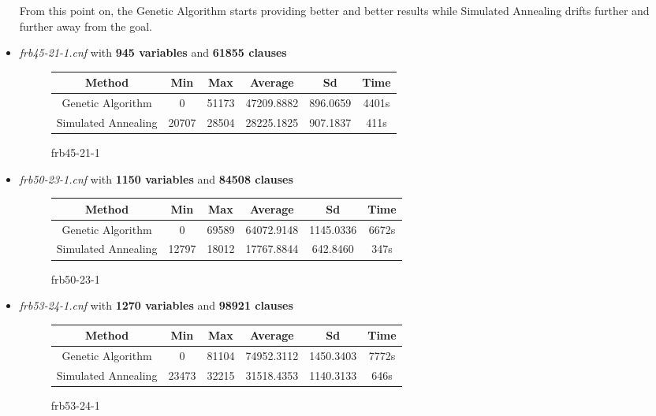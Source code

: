 \documentclass{article}
\begin{document}
\begin{itemize}
    From this point on, the Genetic Algorithm starts providing better and better
    results while Simulated Annealing drifts further and further away from the
    goal.
    
    \item \textit{frb45-21-1.cnf} with \textbf{945 variables} and \textbf{61855 clauses}
    
    \begin{figure}[!htbp]
        \begin{tabular}{|c|c|c|c|c|c|}
        \hline
        \textbf{Method} & \textbf{Min} & \textbf{Max} & \textbf{Average} & \textbf{Sd} & \textbf{Time} \\ \hline
        Genetic Algorithm & 0 & 51173 & 47209.8882 & 896.0659 & 4401s \\ \hline
        Simulated Annealing & 20707 & 28504 & 28225.1825 & 907.1837 & 411s \\ \hline
        \end{tabular}
    \caption{frb45-21-1}
    \end{figure}
    
    \newpage

    \item \textit{frb50-23-1.cnf} with \textbf{1150 variables} and \textbf{84508 clauses}
    
    \begin{figure}[!htbp]
        \begin{tabular}{|c|c|c|c|c|c|}
        \hline
        \textbf{Method} & \textbf{Min} & \textbf{Max} & \textbf{Average} & \textbf{Sd} & \textbf{Time} \\ \hline
        Genetic Algorithm & 0 & 69589 & 64072.9148 & 1145.0336 & 6672s \\ \hline
        Simulated Annealing & 12797 & 18012 & 17767.8844 & 642.8460 & 347s \\ \hline
        \end{tabular}
    \caption{frb50-23-1}
    \end{figure}
    
    \item \textit{frb53-24-1.cnf} with \textbf{1270 variables} and \textbf{98921 clauses}
    
    \begin{figure}[!htbp]
        \begin{tabular}{|c|c|c|c|c|c|}
        \hline
        \textbf{Method} & \textbf{Min} & \textbf{Max} & \textbf{Average} & \textbf{Sd} & \textbf{Time} \\ \hline
        Genetic Algorithm & 0 & 81104 & 74952.3112 & 1450.3403 & 7772s \\ \hline
        Simulated Annealing & 23473 & 32215 & 31518.4353 & 1140.3133 & 646s \\ \hline
        \end{tabular}
    \caption{frb53-24-1}
    \end{figure}
    

\end{itemize}
\end{document}
